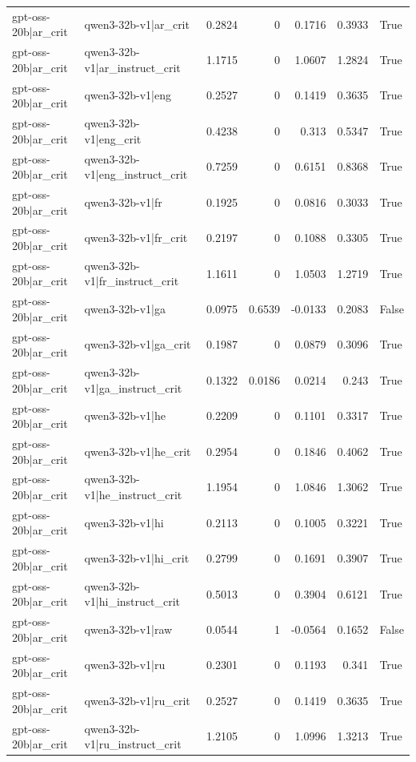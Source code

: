 \begin{table}
\begin{tabular}{l l r r r r l}
gpt-oss-20b|ar_crit & qwen3-32b-v1|ar_crit & 0.2824 & 0 & 0.1716 & 0.3933 & True \\
gpt-oss-20b|ar_crit & qwen3-32b-v1|ar_instruct_crit & 1.1715 & 0 & 1.0607 & 1.2824 & True \\
gpt-oss-20b|ar_crit & qwen3-32b-v1|eng & 0.2527 & 0 & 0.1419 & 0.3635 & True \\
gpt-oss-20b|ar_crit & qwen3-32b-v1|eng_crit & 0.4238 & 0 & 0.313 & 0.5347 & True \\
gpt-oss-20b|ar_crit & qwen3-32b-v1|eng_instruct_crit & 0.7259 & 0 & 0.6151 & 0.8368 & True \\
gpt-oss-20b|ar_crit & qwen3-32b-v1|fr & 0.1925 & 0 & 0.0816 & 0.3033 & True \\
gpt-oss-20b|ar_crit & qwen3-32b-v1|fr_crit & 0.2197 & 0 & 0.1088 & 0.3305 & True \\
gpt-oss-20b|ar_crit & qwen3-32b-v1|fr_instruct_crit & 1.1611 & 0 & 1.0503 & 1.2719 & True \\
gpt-oss-20b|ar_crit & qwen3-32b-v1|ga & 0.0975 & 0.6539 & -0.0133 & 0.2083 & False \\
gpt-oss-20b|ar_crit & qwen3-32b-v1|ga_crit & 0.1987 & 0 & 0.0879 & 0.3096 & True \\
gpt-oss-20b|ar_crit & qwen3-32b-v1|ga_instruct_crit & 0.1322 & 0.0186 & 0.0214 & 0.243 & True \\
gpt-oss-20b|ar_crit & qwen3-32b-v1|he & 0.2209 & 0 & 0.1101 & 0.3317 & True \\
gpt-oss-20b|ar_crit & qwen3-32b-v1|he_crit & 0.2954 & 0 & 0.1846 & 0.4062 & True \\
gpt-oss-20b|ar_crit & qwen3-32b-v1|he_instruct_crit & 1.1954 & 0 & 1.0846 & 1.3062 & True \\
gpt-oss-20b|ar_crit & qwen3-32b-v1|hi & 0.2113 & 0 & 0.1005 & 0.3221 & True \\
gpt-oss-20b|ar_crit & qwen3-32b-v1|hi_crit & 0.2799 & 0 & 0.1691 & 0.3907 & True \\
gpt-oss-20b|ar_crit & qwen3-32b-v1|hi_instruct_crit & 0.5013 & 0 & 0.3904 & 0.6121 & True \\
gpt-oss-20b|ar_crit & qwen3-32b-v1|raw & 0.0544 & 1 & -0.0564 & 0.1652 & False \\
gpt-oss-20b|ar_crit & qwen3-32b-v1|ru & 0.2301 & 0 & 0.1193 & 0.341 & True \\
gpt-oss-20b|ar_crit & qwen3-32b-v1|ru_crit & 0.2527 & 0 & 0.1419 & 0.3635 & True \\
gpt-oss-20b|ar_crit & qwen3-32b-v1|ru_instruct_crit & 1.2105 & 0 & 1.0996 & 1.3213 & True \\

\end{tabular}
\end{table}
